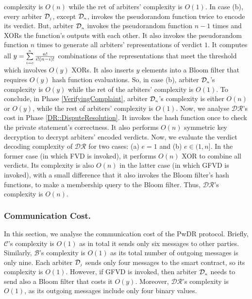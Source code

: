 complexity is $O(n)$ while the ret of arbiters' complexity is $O(1)$.  In case (b), every arbiter $\mathcal{D}_{\scriptscriptstyle j}$, except $\mathcal{D}_{\scriptscriptstyle n}$, invokes the pseudorandom function twice to encode its verdict.  But,  arbiter $\mathcal{D}_{\scriptscriptstyle n}$ invokes the pseudorandom function $n-1$ times and XORs the function's outputs with each other. It also invokes  the pseudorandom function $n$ times to generate all arbiters' representations of verdict $1$. It computes all $y=\sum\limits_{\scriptscriptstyle i=e}^{\scriptscriptstyle n}\frac{n!}{i!(n- i)!}$ combinations of the representations that meet the threshold which involves $O(y)$ XORs. It also inserts $y$ elements into a Bloom filter that requires  $O(y)$ hash function evaluations. So, in case (b), arbiter $\mathcal{D}_{\scriptscriptstyle n}$'s complexity is $O(y)$ while the ret of the arbiters' complexity is $O(1)$. To conclude, in Phase \ref{VerifyingComplaint},  arbiter $\mathcal{D}_{\scriptscriptstyle n}$'s complexity is either $O(n)$ or $O(y)$, while the rest of arbiters' complexity is $O(1)$. Now, we analyse $\mathcal{DR}$'s cost in Phase \ref{DR::DisputeResolution}. It invokes the hash function once to check the private statement's correctness. It also performs $O(n)$ symmetric key decryption to decrypt arbiters' encoded verdicts. Now, we evaluate the verdict decoding complexity of $\mathcal{DR}$ 
for two cases: (a) $e = 1$ and (b) $e \in (1, n]$. In the former case (in which  FVD is invoked), it performs $O(n)$ XOR to combine all verdicts. Its complexity is also $O(n)$ in the latter case (in which  GFVD is invoked), with a small difference that it also invokes the Bloom filter's hash functions, to make a membership query to the Bloom filter.  Thus, $\mathcal{DR}$'s complexity is $O(n)$. 



\subsubsection{Communication Cost.} In this section, we analyse the communication cost of the PwDR protocol. Briefly, $\mathcal{C}$'s complexity is $O(1)$ as in total it sends only six messages to other parties. Similarly, $\mathcal{B}$'s complexity is $O(1)$ as its total number of outgoing messages is only nine. Each arbiter $\mathcal{D}_{\scriptscriptstyle j}$ sends only four messages to the smart contract, so its complexity is $O(1)$. However, if GFVD is invoked, then arbiter $\mathcal{D}_{\scriptscriptstyle n}$ needs to send also a Bloom filter that costs it $O(y)$. Moreover, $\mathcal{DR}$'s complexity is $O(1)$, as its outgoing messages include  only four binary values. 


